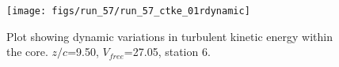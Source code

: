 \begin{figure}[H]
\centering
\texttt{[image: figs/run\_57/run\_57\_ctke\_01rdynamic]}
\caption{Plot showing dynamic variations in turbulent kinetic energy within the core. $z/c$=9.50, $V_{free}$=27.05, station 6.}
\end{figure}


